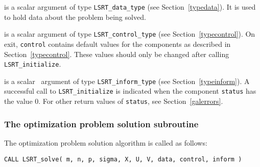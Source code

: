 \documentclass{galahad}
\newcommand{\packagename}{LS\-RT}
\begin{document}
\begin{description}

 is a scalar \intentinout argument of type 
{\tt \packagename\_data\_type}
(see Section~\ref{typedata}). It is used to hold data about the problem being 
solved. 

 is a scalar \intentout argument of type 
{\tt \packagename\_control\_type}
(see Section~\ref{typecontrol}). 
On exit, {\tt control} contains default values for the components as
described in Section~\ref{typecontrol}.
These values should only be changed after calling 
{\tt \packagename\_initialize}.

 is a scalar \intentout\ argument of type 
{\tt \packagename\_inform\_type}
(see Section~\ref{typeinform}). A successful call to
{\tt \packagename\_initialize}
is indicated when the  component {\tt status} has the value 0. 
For other return values of {\tt status}, see Section~\ref{galerrors}.

\end{description}


\subsubsection{The optimization problem solution subroutine}
The optimization problem solution algorithm is called as follows:

\hskip0.5in 
{\tt CALL \packagename\_solve( m, n, p, sigma, X, U, V, data, control, inform )}
\end{document}
